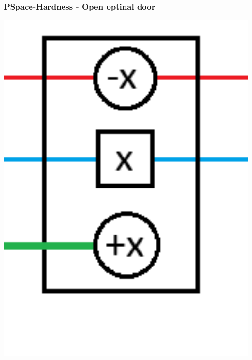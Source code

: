 \documentclass{beamer}
\begin{document}
\begin{frame}
  \frametitle{PSpace-Hardness - Open optinal door}
  \begin{minipage}[t]{0.49\textwidth}
    \includegraphics[width=1\textwidth]{res/OpenOptinalNormal.png}
  \end{minipage}
  \begin{minipage}[t]{0.49\textwidth}

\end{minipage}
\end{frame}
\end{document}

